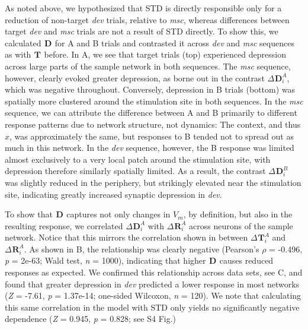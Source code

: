 \documentclass[9pt,lineno,onehalfspacing]{elife}
\newcommand{\dev}{\textit{dev}}
\newcommand{\msc}{\textit{msc}}
\newcommand{\R}[3][]{{}^{#1}_{}\boldsymbol R^{#2}_{#3}}
\newcommand{\T}[3][]{{}^{#1}_{}\boldsymbol T^{#2}_{#3}}
\newcommand{\D}[3][]{{}^{#1}_{}\boldsymbol D^{#2}_{#3}}
\begin{document}
As noted above, we hypothesized that STD is directly responsible only for a reduction of non-target \dev{} trials, relative to \msc{}, whereas differences between target \dev{} and \msc{} trials are not a result of STD directly. To show this, we calculated $\D{}{}$ for A and B trials and contrasted it across \dev{} and \msc{} sequences as with $\T{}{}$ before.
In A, we see that target trials (top) experienced depression across large parts of the sample network in both sequences. The \msc{} sequence, however, clearly evoked greater depression, as borne out in the contrast $\Delta \D{A}{i}$, which was negative throughout. Conversely, depression in B trials (bottom) was spatially more clustered around the stimulation site in both sequences. In the \msc{} sequence, we can attribute the difference between A and B primarily to different response patterns due to network structure, not dynamics: The context, and thus $x$, was approximately the same, but responses to B tended not to spread out as much in this network. In the \dev{} sequence, however, the B response was limited almost exclusively to a very local patch around the stimulation site, with depression therefore similarly spatially limited. As a result, the contrast $\Delta \D{B}{i}$ was slightly reduced in the periphery, but strikingly elevated near the stimulation site, indicating greatly increased synaptic depression in \dev{}.

To show that $\D{}{}$ captures not only changes in $V_m$, by definition, but also in the resulting response, we correlated $\Delta \D{A}{i}$ with $\Delta \R{A}{i}$ across neurons of the sample network. Notice that this mirrors the correlation shown in  between $\Delta \T{A}{i}$ and $\Delta \R{A}{i}$. As shown in B, the relationship was clearly negative (Pearson's $\rho$ = -0.496, \textit{p} = 2e-63; Wald test, \textit{n} = 1000), indicating that higher $\D{}{}$ causes reduced responses as expected. We confirmed this relationship across data sets, see C, and found that greater depression in \dev{} predicted a lower response in most networks (\textit{Z} = -7.61, \textit{p} = 1.37e-14; one-sided Wilcoxon, \textit{n} = 120). We note that calculating this same correlation in the model with STD only yields no significantly negative dependence (\textit{Z} = 0.945, \textit{p} = 0.828; see S4 Fig.)
\end{document}
